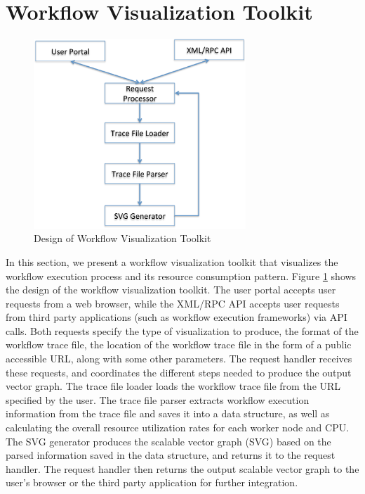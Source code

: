 \section{Workflow Visualization Toolkit}
\label{v1_sec:visualization}

\begin{figure}[t!]
\centering
\includegraphics[width=8cm]{toolkit}
\caption{Design of Workflow Visualization Toolkit}
	\label{fig:toolkit}
\end{figure}



In this section, we present a workflow visualization toolkit that visualizes the workflow execution process and its resource consumption pattern. Figure \ref{fig:toolkit} shows the design of the workflow visualization toolkit. The user portal accepts user requests from a web browser, while the XML/RPC API accepts user requests from third party applications (such as workflow execution frameworks) via API calls. Both requests specify the type of visualization to produce, the format of the workflow trace file, the location of the workflow trace file in the form of a public accessible URL, along with some other parameters. The request handler receives these requests, and coordinates the different steps needed to produce the output vector graph. The trace file loader loads the workflow trace file from the URL specified by the user. The trace file parser extracts workflow execution information from the trace file and saves it into a data structure, as well as calculating the overall resource utilization rates for each worker node and CPU. The SVG generator produces the scalable vector graph (SVG) based on the parsed information saved in the data structure, and returns it to the request handler. The request handler then returns the output scalable vector graph to the user's browser or the third party application for further integration.

